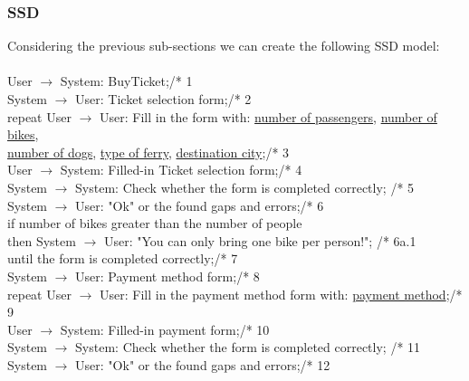 \subsubsection{SSD}
\creator{\studentA}
\updater{\studentB}
\secondUpdater{\studentC}
Considering the previous sub-sections we can create the following SSD model:\\\\
User $\rightarrow$ System: BuyTicket;\hfill /* 1\\
System $\rightarrow$ User: Ticket selection form;\hfill /* 2\\
repeat User $\rightarrow$ User: Fill in the form with: \underline{number of passengers}, \underline{number of bikes},\\ \underline{number of dogs}, \underline{type of ferry}, \underline{destination city};\hfill /* 3\\
\phantom{x}\hspace{7mm} User $\rightarrow$ System: Filled-in Ticket selection form;\hfill /* 4\\
\phantom{x}\hspace{7mm} System $\rightarrow$ System: Check whether the form is completed correctly; \hfill /* 5\\
\phantom{x}\hspace{7mm} System $\rightarrow$ User: "Ok" or the found gaps and errors;\hfill /* 6\\
\phantom{x}\hspace{7mm} if number of bikes greater than the number of people\\
\phantom{x}\hspace{14mm} then System $\rightarrow$ User: "You can only bring one bike per person!"; \hfill /* 6a.1\\
until the form is completed correctly;\hfill /* 7\\
System $\rightarrow$ User: Payment method form;\hfill /* 8\\
repeat User $\rightarrow$ User: Fill in the payment method form with: \underline{payment method};\hfill /* 9\\
\phantom{x}\hspace{7mm} User $\rightarrow$ System: Filled-in payment form;\hfill /* 10\\
\phantom{x}\hspace{7mm} System $\rightarrow$ System: Check whether the form is completed correctly; \hfill /* 11\\
\phantom{x}\hspace{7mm} System $\rightarrow$ User: "Ok" or the found gaps and errors;\hfill /* 12\\
